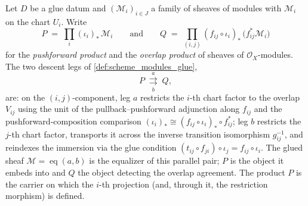 \begin{definition}\leanok
  \label{def:gr_glue_equalizer}
  Let \(D\) be a glue datum and \((\mathcal{M}_i)_{i \in J}\) a family of sheaves of
  modules with \(\mathcal{M}_i\) on the chart \(U_i\). Write
  \[
    P \;=\; \prod_{i} (\iota_i)_{*}\,\mathcal{M}_i
    \qquad\text{and}\qquad
    Q \;=\; \prod_{(i,j)} (f_{ij} \circ \iota_i)_{*}\,\bigl(f_{ij}^{*}\mathcal{M}_i\bigr)
  \]
  for the \emph{pushforward product} and the \emph{overlap product} of sheaves of
  \(\mathcal{O}_X\)-modules. The two descent legs of \cref{def:scheme_modules_glue},
  \[
    P \;\underset{b}{\overset{a}{\rightrightarrows}}\; Q,
  \]
  are: on the \((i,j)\)-component, leg \(a\) restricts the \(i\)-th chart factor to
  the overlap \(V_{ij}\) using the unit of the pullback--pushforward adjunction along
  \(f_{ij}\) and the pushforward-composition comparison
  \((\iota_i)_{*} \cong (f_{ij} \circ \iota_i)_{*} \circ f_{ij}^{*}\); leg \(b\)
  restricts the \(j\)-th chart factor, transports it across the inverse transition
  isomorphism \(g_{ij}^{-1}\), and reindexes the immersion via the glue condition
  \((t_{ij} \circ f_{ji}) \circ \iota_j = f_{ij} \circ \iota_i\). The glued sheaf
  \(\mathcal{M} = \operatorname{eq}(a,b)\) is the equalizer of this parallel pair;
  \(P\) is the object it embeds into and \(Q\) the object detecting the overlap
  agreement. The product \(P\) is the carrier on which the \(i\)-th projection (and,
  through it, the restriction morphism) is defined.
\end{definition}

